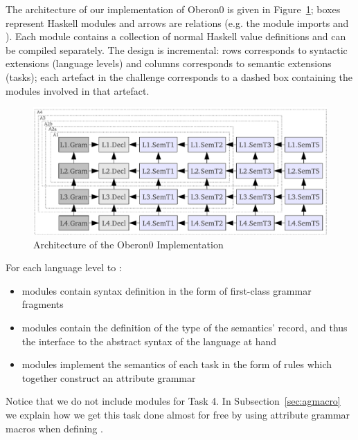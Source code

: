 The architecture of our implementation of Oberon0 is given in Figure~\ref{fig:modules};
boxes represent Haskell modules and arrows are  relations 
(e.g. the module  imports  and ).
Each module contains a collection of normal Haskell value definitions and can be compiled separately. 
The design is incremental:  rows corresponds to syntactic extensions (language levels) and
 columns corresponds to semantic extensions (tasks);
each artefact in the challenge corresponds to a dashed box containing the modules involved in that artefact.
\begin{figure}[th]
\begin{center}
	\includegraphics[scale=0.65]{cococo/modules.pdf}
\caption{Architecture of the Oberon0 Implementation}
\label{fig:modules}
\end{center}
\end{figure}
For each language level  to : 
%
\begin{itemize}
	\item  {} modules contain syntax definition in the form of first-class grammar fragments 
	\item {} modules contain the definition of the type of the semantics' record, and thus the interface to the abstract syntax of the language at hand
	\item {} modules implement the semantics of each task in the form of rules which together construct an attribute grammar
\end{itemize}
%
Notice that we do not include modules for Task 4. 
In Subsection~\ref{sec:agmacro} we  explain how we get this task done almost for free by using attribute grammar macros when defining  .

